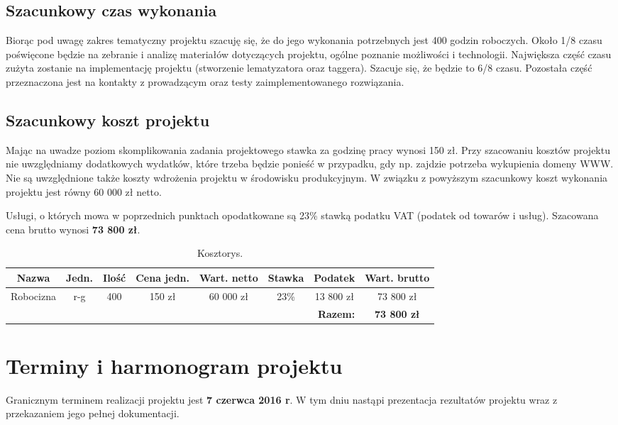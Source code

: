 \subsection*{Szacunkowy czas wykonania}
Biorąc pod uwagę zakres tematyczny projektu szacuję się, że do jego wykonania potrzebnych jest 400 godzin roboczych. Około 1/8 czasu poświęcone będzie na zebranie i analizę materiałów dotyczących projektu, ogólne poznanie możliwości i technologii. Największa część czasu zużyta zostanie na implementację projektu (stworzenie lematyzatora oraz taggera). Szacuje się, że będzie to 6/8 czasu. Pozostała część przeznaczona jest na kontakty z prowadzącym oraz testy zaimplementowanego rozwiązania.

\subsection*{Szacunkowy koszt projektu}
Mając na uwadze poziom skomplikowania zadania projektowego stawka za godzinę pracy wynosi 150 zł. Przy szacowaniu kosztów projektu nie uwzględniamy dodatkowych wydatków, które trzeba będzie ponieść w przypadku, gdy np. zajdzie potrzeba wykupienia domeny WWW. Nie są uwzględnione także koszty wdrożenia projektu w środowisku produkcyjnym. W związku z powyższym szacunkowy koszt wykonania projektu jest równy 60 000 zł netto.

Usługi, o których mowa w poprzednich punktach opodatkowane są 23\% stawką podatku VAT (podatek od towarów i usług). Szacowana cena brutto wynosi \textbf{73 800 zł}.

\begin{table}[H]
	\centering
	\caption{Kosztorys.}
	\smallskip
	\begin{tabular}{|c|c|c|c|c|c|c|c|}
		\hline
		\textbf{Nazwa} & \textbf{Jedn.} & \textbf{Ilość} & \textbf{Cena jedn.} & \textbf{Wart. netto} & \textbf{Stawka} & \textbf{Podatek} & \textbf{Wart. brutto} \\\hline
		Robocizna & r-g & 400 & 150 zł & 60 000 zł & 23\% & 13 800 zł & 73 800 zł \\\hline
		\multicolumn{7}{r|}{\bf Razem:} & \textbf{73 800 zł} \\\cline{8-8}
	\end{tabular}
\end{table}

\section{Terminy i harmonogram projektu}
Granicznym terminem realizacji projektu jest \textbf{7 czerwca 2016 r}. W tym dniu nastąpi prezentacja rezultatów projektu wraz z przekazaniem jego pełnej dokumentacji.

